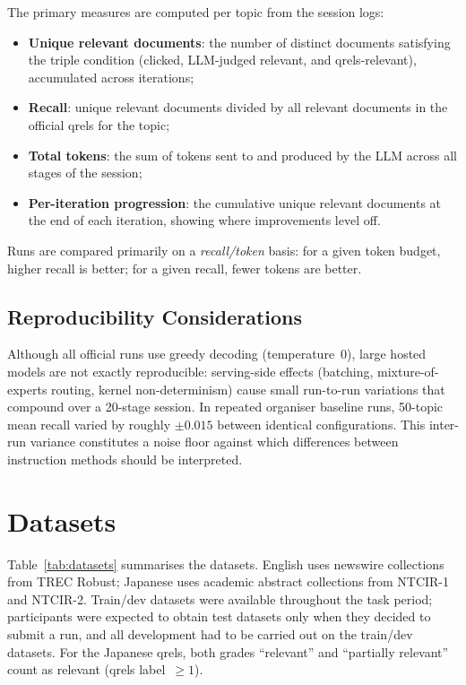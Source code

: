 \documentclass[sigconf,article]{acmart}
\begin{document}
The primary measures are computed per topic from the session logs:

\begin{itemize}
  \item \textbf{Unique relevant documents}: the number of distinct documents
  satisfying the triple condition (clicked, LLM-judged relevant, and
  qrels-relevant), accumulated across iterations;
  \item \textbf{Recall}: unique relevant documents divided by all relevant
  documents in the official qrels for the topic;
  \item \textbf{Total tokens}: the sum of tokens sent to and produced by the
  LLM across all stages of the session;
  \item \textbf{Per-iteration progression}: the cumulative unique relevant
  documents at the end of each iteration, showing where improvements level
  off.
\end{itemize}

Runs are compared primarily on a \emph{recall/token} basis: for a given token
budget, higher recall is better; for a given recall, fewer tokens are better.

\subsection{Reproducibility Considerations}

Although all official runs use greedy decoding (temperature~0), large hosted
models are not exactly reproducible: serving-side effects (batching,
mixture-of-experts routing, kernel non-determinism) cause small run-to-run
variations that compound over a 20-stage session. In repeated organiser
baseline runs, 50-topic mean recall varied by roughly $\pm 0.015$ between
identical configurations. This inter-run variance constitutes a noise floor
against which differences between instruction methods should be interpreted.

\section{Datasets}
\label{sec:datasets}

Table~\ref{tab:datasets} summarises the datasets. English uses newswire
collections from TREC Robust; Japanese uses academic abstract collections
from NTCIR-1 and NTCIR-2. Train/dev datasets were available throughout the
task period; participants were expected to obtain test datasets only when
they decided to submit a run, and all development had to be carried out on
the train/dev datasets. For the Japanese qrels, both grades ``relevant'' and
``partially relevant'' count as relevant (qrels label~$\geq 1$).
\end{document}
